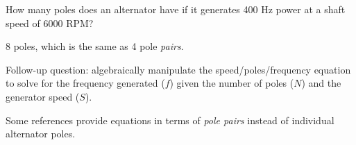 

How many poles does an alternator have if it generates 400 Hz power at a shaft speed of 6000 RPM?







8 poles, which is the same as 4 pole {\it pairs}.

\vskip 10pt

Follow-up question: algebraically manipulate the speed/poles/frequency equation to solve for the frequency generated ($f$) given the number of poles ($N$) and the generator speed ($S$).







Some references provide equations in terms of {\it pole pairs} instead of individual alternator poles.




